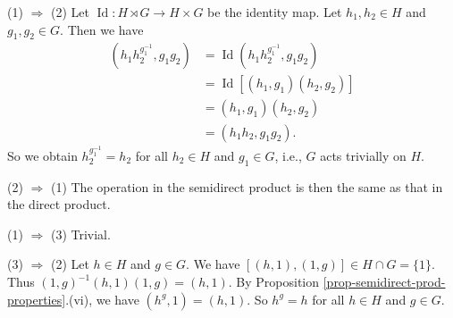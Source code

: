 \begin{sketch}
	(1) $\Rightarrow$ (2) Let $\operatorname{Id}:H \rtimes G\to H \times G$ be the identity map. Let $h_1, h_2 \in H$ and $g_1, g_2 \in G$. Then we have
	\begin{align*}
		(h_1  h_2^{g_1^{-1}}, g_1 g_2) &= \operatorname{Id}(h_1  h_2^{g_1^{-1}}, g_1 g_2)
		\\
		&=\operatorname{Id}[(h_1, g_1)(h_2, g_2) ]
		\\
		&= (h_1, g_1)(h_2, g_2)
		\\&=(h_1 h_2, g_1 g_2).
	\end{align*}
	So we obtain $h_2^{g_1^{-1}}= h_2$ for all $h_2 \in H$ and  $g_1 \in G$, i.e., $G$ acts trivially on $H$.
	
	(2) $\Rightarrow$ (1) The operation in the semidirect product is then the same as that in the direct product.
	
	(1) $\Rightarrow$ (3) Trivial.
	
	 (3) $\Rightarrow$ (2) Let $h\in H$ and $g\in G$. We have $[(h,1), (1,g)] \in H \cap G = \{1\}$. Thus $(1,g)^{-1}(h,1)(1,g) = (h,1)$. By Proposition \ref{prop-semidirect-prod-properties}.(vi), we have $(h^g,1) = (h,1)$. So $h^g =h$ for all $h\in H$ and $g\in G$.
\end{sketch} 
